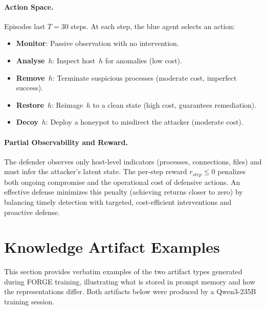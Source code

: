 \documentclass[sigconf]{acmart}
\begin{document}
\paragraph{Action Space.} Episodes last $T{=}30$ steps. At each step, the blue agent selects an action:
\begin{itemize}
  \item \textbf{Monitor}: Passive observation with no intervention.
  \item \textbf{Analyse}~$h$: Inspect host~$h$ for anomalies (low cost).
  \item \textbf{Remove}~$h$: Terminate suspicious processes (moderate cost, imperfect success).
  \item \textbf{Restore}~$h$: Reimage~$h$ to a clean state (high cost, guarantees remediation).
  \item \textbf{Decoy}~$h$: Deploy a honeypot to misdirect the attacker (moderate cost).
\end{itemize}

\paragraph{Partial Observability and Reward.}
The defender observes only host-level indicators (processes, connections, files) and must infer the attacker's latent state. The per-step reward $r_{step} \le 0$ penalizes both ongoing compromise and the operational cost of defensive actions. An effective defense minimizes this penalty (achieving returns closer to zero) by balancing timely detection with targeted, cost-efficient interventions and proactive defense.

\section{Knowledge Artifact Examples}
\label{app:artifacts}
This section provides verbatim examples of the two artifact types generated during FORGE training, illustrating what is stored in prompt memory and how the representations differ. Both artifacts below were produced by a Qwen3-235B training session.
\end{document}
